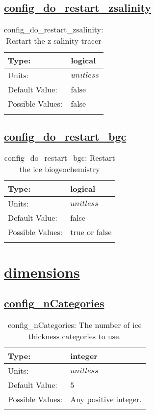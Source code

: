 \subsection[config\_do\_restart\_zsalinity]{\hyperref[sec:nm_tab_restart]{config\_do\_restart\_zsalinity}}
\label{subsec:nm_sec_config_do_restart_zsalinity}
\begin{center}
\begin{longtable}{| p{2.0in} || p{4.0in} |}
    \hline
    Type: & logical \\
    \hline
    Units: & $unitless$ \\
    \hline
    Default Value: & false \\
    \hline
    Possible Values: & false \\
    \hline
    \caption{config\_do\_restart\_zsalinity: Restart the z-salinity tracer}
\end{longtable}
\end{center}
\subsection[config\_do\_restart\_bgc]{\hyperref[sec:nm_tab_restart]{config\_do\_restart\_bgc}}
\label{subsec:nm_sec_config_do_restart_bgc}
\begin{center}
\begin{longtable}{| p{2.0in} || p{4.0in} |}
    \hline
    Type: & logical \\
    \hline
    Units: & $unitless$ \\
    \hline
    Default Value: & false \\
    \hline
    Possible Values: & true or false \\
    \hline
    \caption{config\_do\_restart\_bgc: Restart the ice biogeochemistry}
\end{longtable}
\end{center}
\section[dimensions]{\hyperref[sec:nm_tab_dimensions]{dimensions}}
\label{sec:nm_sec_dimensions}
\subsection[config\_nCategories]{\hyperref[sec:nm_tab_dimensions]{config\_nCategories}}
\label{subsec:nm_sec_config_nCategories}
\begin{center}
\begin{longtable}{| p{2.0in} || p{4.0in} |}
    \hline
    Type: & integer \\
    \hline
    Units: & $unitless$ \\
    \hline
    Default Value: & 5 \\
    \hline
    Possible Values: & Any positive integer. \\
    \hline
    \caption{config\_nCategories: The number of ice thickness categories to use.}
\end{longtable}
\end{center}
